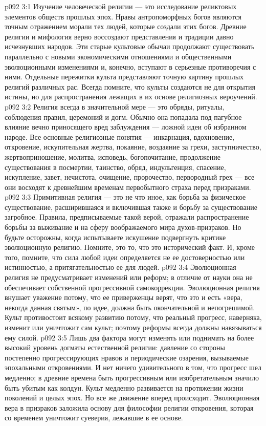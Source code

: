 \vs p092 3:1 Изучение человеческой религии --- это исследование реликтовых элементов обществ прошлых эпох. Нравы антропоморфных богов являются точным отражением морали тех людей, которые создали этих богов. Древние религии и мифология верно воссоздают представления и традиции давно исчезнувших народов. Эти старые культовые обычаи продолжают существовать параллельно с новыми экономическими отношениями и общественными эволюционными изменениями и, конечно, вступают в серьезные противоречия с ними. Отдельные пережитки культа представляют точную картину прошлых религий различных рас. Всегда помните, что культы создаются не для открытия истины, но для распространения лежащих в их основе религиозных вероучений.
\vs p092 3:2 Религия всегда в значительной мере --- это обряды, ритуалы, соблюдения правил, церемоний и догм. Обычно она попадала под пагубное влияние вечно приносящего вред заблуждения --- ложной идеи об избранном народе. Все основные религиозные понятия --- инкарнация, вдохновение, откровение, искупительная жертва, покаяние, воздаяние за грехи, заступничество, жертвоприношение, молитва, исповедь, богопочитание, продолжение существования в посмертии, таинство, обряд, индульгенция, спасение, искупление, завет, нечистота, очищение, пророчество, первородный грех --- все они восходят к древнейшим временам первобытного страха перед призраками.
\vs p092 3:3 \pc Примитивная религия --- это не что иное, как борьба за физическое существование, расширившаяся и включившая также и борьбу за существование загробное. Правила, предписываемые такой верой, отражали распространение борьбы за выживание и на сферу воображаемого мира духов\hyp{}призраков. Но будьте осторожны, когда испытываете искушение подвергнуть критике эволюционную религию. Помните, это то, что  это исторический факт. И, кроме того, помните, что сила любой идеи определяется не ее достоверностью или истинностью, а притягательностью ее для людей.
\vs p092 3:4 \pc Эволюционная религия не предусматривает изменений или реформ; в отличие от науки она не обеспечивает собственной прогрессивной самокоррекции. Эволюционная религия внушает уважение потому, что ее приверженцы верят, что это и есть  «вера, некогда данная святым», по идее, должна быть окончательной и непогрешимой. Культ противостоит всякому развитию потому, что реальный прогресс, наверняка, изменит или уничтожит сам культ; поэтому реформы всегда должны навязываться ему силой.
\vs p092 3:5 Лишь два фактора могут изменять или поднимать на более высокий уровень догматы естественной религии: давление со стороны постепенно прогрессирующих нравов и периодические озарения, вызываемые эпохальными откровениями. И нет ничего удивительного в том, что прогресс шел медленно; в древние времена быть прогрессивным или изобретательным значило быть убитым как колдун. Культ медленно развивается на протяжении жизни поколений и целых эпох. Но все же движение вперед происходит. Эволюционная вера в призраков заложила основу для философии религии откровения, которая со временем уничтожит суеверия, лежавшие в ее основе.
